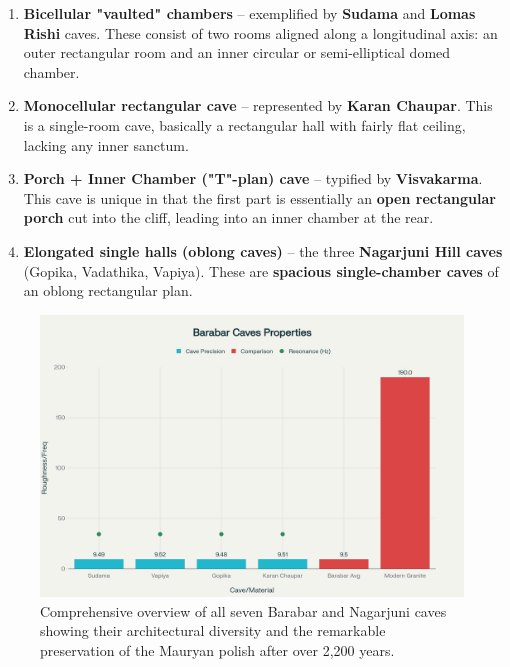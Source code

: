 \documentclass[11pt]{article}
\begin{document}
\begin{enumerate}
\item \textbf{Bicellular "vaulted" chambers} -- exemplified by \textbf{Sudama} and \textbf{Lomas Rishi} caves. These consist of two rooms aligned along a longitudinal axis: an outer rectangular room and an inner circular or semi-elliptical domed chamber.

\item \textbf{Monocellular rectangular cave} -- represented by \textbf{Karan Chaupar}. This is a single-room cave, basically a rectangular hall with fairly flat ceiling, lacking any inner sanctum.

\item \textbf{Porch + Inner Chamber ("T"-plan) cave} -- typified by \textbf{Visvakarma}. This cave is unique in that the first part is essentially an \textbf{open rectangular porch} cut into the cliff, leading into an inner chamber at the rear.

\item \textbf{Elongated single halls (oblong caves)} -- the three \textbf{Nagarjuni Hill caves} (Gopika, Vadathika, Vapiya). These are \textbf{spacious single-chamber caves} of an oblong rectangular plan.
\end{enumerate}

\begin{figure}[H]
\centering
\includegraphics[width=\linewidth]{barabar_caves_complete.png}
\caption{Comprehensive overview of all seven Barabar and Nagarjuni caves showing their architectural diversity and the remarkable preservation of the Mauryan polish after over 2,200 years.}
\label{fig:caves_complete}
\end{figure}
\end{document}
